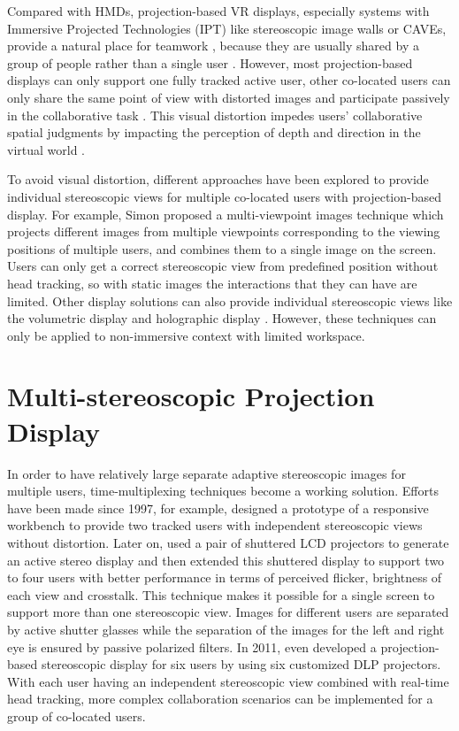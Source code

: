 Compared with HMDs, projection-based VR displays, especially systems with Immersive Projected Technologies (IPT) like stereoscopic image walls or CAVEs, provide a natural place for teamwork \citep{Johanson2002IWP}, because they are usually shared by a group of people rather than a single user \citep{Benford1996SST}. However, most projection-based displays can only support one fully tracked active user, other co-located users can only share the same point of view with distorted images and participate passively in the collaborative task \citep{Bayon2006Multiple}. This visual distortion impedes users’ collaborative spatial judgments by impacting the perception of depth and direction in the virtual world \citep{Pollock2012Right}.

To avoid visual distortion, different approaches have been explored to provide individual stereoscopic views for multiple co-located users with projection-based display. For example, Simon proposed a multi-viewpoint images technique \citep{Simon2007MVI} which projects different images from multiple viewpoints corresponding to the viewing positions of multiple users, and combines them to a single image on the screen. Users can only get a correct stereoscopic view from predefined position without head tracking, so with static images the interactions that they can have are limited. Other display solutions can also provide individual stereoscopic views like the volumetric display \citep{Grossman2008Volum} and holographic display \citep{Lucente1997Holo}. However, these techniques can only be applied to non-immersive context with limited workspace.


\section{Multi-stereoscopic Projection Display}

In order to have relatively large separate adaptive stereoscopic images for multiple users, time-multiplexing techniques become a working solution. Efforts have been made since 1997, for example, \citet{Agrawala1997TRW} designed a prototype of a responsive workbench to provide two tracked users with independent stereoscopic views without distortion. Later on, \citet{Kunz2002TSC} used a pair of shuttered LCD projectors to generate an active stereo display and then \citet{Frohlich2005MultiViewer} extended this shuttered display to support two to four users with better performance in terms of perceived flicker, brightness of each view and crosstalk. This technique makes it possible for a single screen to support more than one stereoscopic view. Images for different users are separated by active shutter glasses while the separation of the images for the left and right eye is ensured by passive polarized filters. In 2011, \citet{Kulik2011CSS} even developed a projection-based stereoscopic display for six users by using six customized DLP projectors. With each user having an independent stereoscopic view combined with real-time head tracking, more complex collaboration scenarios can be implemented for a group of co-located users.

